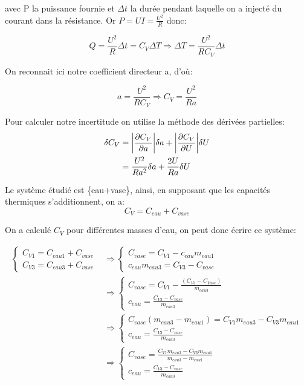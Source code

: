 \documentclass[12pt]{article}
\begin{document}
avec P la puissance fournie et $\Delta t$ la durée pendant laquelle on a injecté du courant dans la résistance. Or $P=UI=\frac{U^2}{R}$ donc:

	\begin{equation}
Q=\frac{U^2}{R}\Delta t = C_V \Delta T 
\Rightarrow \Delta T =\frac{U^2}{RC_V}\Delta t
	\end{equation}

On reconnait ici notre coefficient directeur a, d'où:

\begin{equation}
a=\frac{U^2}{RC_V} \Rightarrow C_V=\frac{U^2}{Ra}
\end{equation}	

Pour calculer notre incertitude on utilise la méthode des dérivées partielles:
\begin{align*}
\delta C_V & = \abs{\frac{\partial C_V}{\partial a}} \delta a + \abs{\frac{\partial C_V}{\partial U}} \delta U \\
&=\frac{U^2}{Ra^2}\delta a +\frac{2U}{Ra}\delta U
\end{align*}

Le système étudié est \{eau+vase\}, ainsi, en supposant que les capacités thermiques s'additionnent, on a:
\begin{equation}
C_V=C_{eau}+C_{vase}
\end{equation}

\newpage
On a calculé $C_V$ pour différentes masses d'eau, on peut donc écrire ce système:

\begin{equation}
	\begin{split}
		\begin{cases}
			C_{V1}=C_{eau1}+C_{vase} \\
			C_{V3}=C_{eau3}+C_{vase}
		\end{cases} 
&\Rightarrow 
		\begin{cases}
			C_{vase}=C_{V1}-c_{eau}m_{eau1} \\
			c_{eau}m_{eau3}=C_{V3}-C_{vase}
		\end{cases} \\
&\Rightarrow 
		\begin{cases}
			C_{vase}=C_{V1}-\frac{(C_{V3}-C_{Vase})}{m_{eau3}} \\
			c_{eau}=\frac{C_{V3}-C_{vase}}{m_{eau3}}
		\end{cases} \\
&\Rightarrow 
		\begin{cases}
			C_{vase}(m_{eau3}-m_{eau1})=C_{V1}m_{eau3}-C_{V3}m_{eau1} \\
			c_{eau}=\frac{C_{V3}-C_{vase}}{m_{eau3}}
		\end{cases} \\
&\Rightarrow 		
		\begin{cases}
			C_{vase}=\frac{C_{V1}m_{eau3}-C_{V3}m_{eau1}}{m_{eau3}-m_{eau1}}  \\
			c_{eau}=\frac{C_{V3}-C_{vase}}{m_{eau3}}
		\end{cases}
	\end{split}	
\end{equation}
\end{document}
